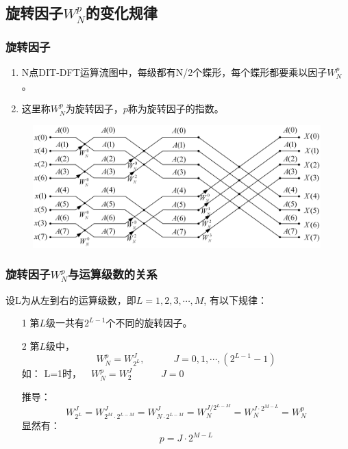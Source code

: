 \documentclass[notheorems,compress,mathserif,table]{beamer}
\begin{document}
\subsection{旋转因子$W_N^p$的变化规律}
\begin{frame}[shrink]\frametitle{旋转因子}
\begin{enumerate}
  \item N点DIT-DFT运算流图中，每级都有N/2个蝶形，每个蝶形都要乘以因子$W_N^p$。
  \item 这里称$W_N^p$为旋转因子，$p$称为旋转因子的指数。
\end{enumerate}

\begin{figure}[h]
  \centering
  \includegraphics[width=0.99\textwidth]{8dftThird.jpg}
\end{figure}
\end{frame}
\begin{frame}\frametitle{旋转因子$W_N^p$与运算级数的关系}%
%
设L为从左到右的运算级数，即$L=1,2,3,\cdots,M$,
有以下规律：
\pause
\begin{enumerate}
  \item [1] 第$L$级一共有$2^{L-1}$个不同的旋转因子。
  \item [2] 第$L$级中，
        $$W_N^p=W_{2^L}^{J},\quad\quad\quad J=0,1,\cdots,(2^{L-1}-1)$$
        \pause 如： L=1时，$\quad W_N^p=W_2^J\quad\quad\quad J=0$
        \par 推导：
        $$W_{2^L}^{J} = W_{2^M\cdot2^{L-M}}^{J} = W_{N\cdot2^{L-M}}^{J} = W_{N}^{J/2^{L-M}} = W_{N}^{J\cdot 2^{M-L}} =W_N^p$$
        \pause 显然有：
        $$p=J\cdot 2^{M-L}$$
\end{enumerate}
\end{frame}
\end{document}
